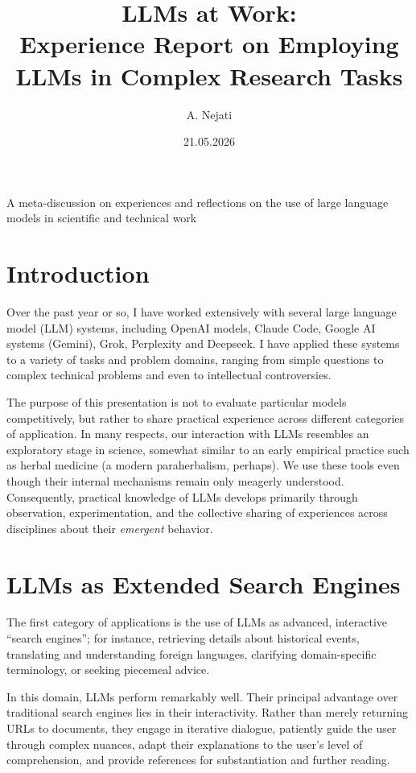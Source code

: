 \documentclass[10pt,a4paper]{article}
\title{LLMs at Work:\\Experience Report on Employing LLMs in Complex Research Tasks}
\author{A. Nejati}
\date{21.05.2026}
\begin{document}
\maketitle

\begin{center}
A meta-discussion on experiences and reflections on the use of large language models in scientific and technical work
\end{center}

\section{Introduction}
Over the past year or so, I have worked extensively with several large language model (LLM) systems, including OpenAI models, Claude Code, Google AI systems (Gemini), Grok, Perplexity and Deepseek. I have applied these systems to a variety of tasks and problem domains, ranging from simple questions to complex technical problems and even to intellectual controversies.

The purpose of this presentation is not to evaluate particular models competitively, but rather to share practical experience across different categories of application. In many respects, our interaction with LLMs resembles an exploratory stage in science, somewhat similar to an early empirical practice such as herbal medicine (a modern paraherbalism, perhaps). We use these tools even though their internal mechanisms remain only meagerly understood. Consequently, practical knowledge of LLMs develops primarily through observation, experimentation, and the collective sharing of experiences across disciplines about their \emph{emergent} behavior.

\section{LLMs as Extended Search Engines}
The first category of applications is the use of LLMs as advanced, interactive ``search engines''; for instance, retrieving details about historical events, translating and understanding foreign languages, clarifying domain-specific terminology, or seeking piecemeal advice.

In this domain, LLMs perform remarkably well. Their principal advantage over traditional search engines lies in their interactivity. Rather than merely returning URLs to documents, they engage in iterative dialogue, patiently guide the user through complex nuances, adapt their explanations to the user's level of comprehension, and provide references for substantiation and further reading.
\end{document}

